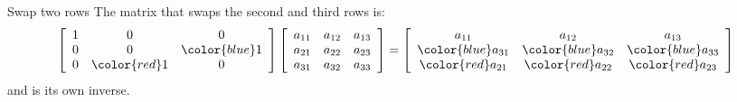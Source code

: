\documentclass{beamer}
\begin{document}
\begin{frame}{Swap two rows}
  The matrix that swaps the second and third rows is:
    \begin{equation*}
    \left[
      \begin{array}{ccc}
        1&0&0\\
        0&0&{\color{blue}1}\\
        0&{\color{red}1}&0\\
      \end{array}
    \right]
    \left[
      \begin{array}{ccc}
        a_{11}&a_{12}&a_{13}\\
        a_{21}&a_{22}&a_{23}\\
        a_{31}&a_{32}&a_{33}
      \end{array}
    \right]=
    \left[
      \begin{array}{ccc}
        a_{11}&a_{12}&a_{13}\\
        {\color{blue}a_{31}}&{\color{blue}a_{32}}&{\color{blue}a_{33}}\\
        {\color{red}a_{21}}&{\color{red}a_{22}}&{\color{red}a_{23}}
      \end{array}
    \right]
  \end{equation*}
  and is its own inverse.
\end{frame}
\end{document}
